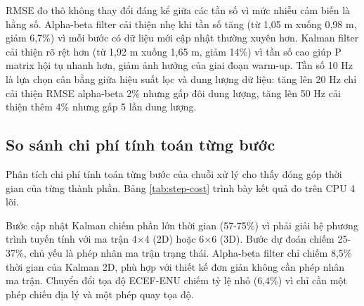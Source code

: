 RMSE đo thô không thay đổi đáng kể giữa các tần số vì mức nhiễu cảm biến là hằng số. Alpha-beta filter cải thiện nhẹ khi tần số tăng (từ 1,05 m xuống 0,98 m, giảm 6,7\%) vì mỗi bước có dữ liệu mới cập nhật thường xuyên hơn. Kalman filter cải thiện rõ rệt hơn (từ 1,92 m xuống 1,65 m, giảm 14\%) vì tần số cao giúp P matrix hội tụ nhanh hơn, giảm ảnh hưởng của giai đoạn warm-up. Tần số 10 Hz là lựa chọn cân bằng giữa hiệu suất lọc và dung lượng dữ liệu: tăng lên 20 Hz chỉ cải thiện RMSE alpha-beta 2\% nhưng gấp đôi dung lượng, tăng lên 50 Hz cải thiện thêm 4\% nhưng gấp 5 lần dung lượng.

\subsection{So sánh chi phí tính toán từng bước}

\hspace{0.5cm} Phân tích chi phí tính toán từng bước của chuỗi xử lý cho thấy đóng góp thời gian của từng thành phần. Bảng \ref{tab:step-cost} trình bày kết quả đo trên CPU 4 lõi.

\begin{table}[H]
\centering
\caption{Chi phí tính toán từng bước trong chuỗi xử lý}
\label{tab:step-cost}
\end{table}

Bước cập nhật Kalman chiếm phần lớn thời gian (57-75\%) vì phải giải hệ phương trình tuyến tính với ma trận 4$\times$4 (2D) hoặc 6$\times$6 (3D). Bước dự đoán chiếm 25-37\%, chủ yếu là phép nhân ma trận trạng thái. Alpha-beta filter chỉ chiếm 8,5\% thời gian của Kalman 2D, phù hợp với thiết kế đơn giản không cần phép nhân ma trận. Chuyển đổi tọa độ ECEF-ENU chiếm tỷ lệ nhỏ (6,4\%) vì chỉ cần một phép chiếu địa lý và một phép quay tọa độ.

